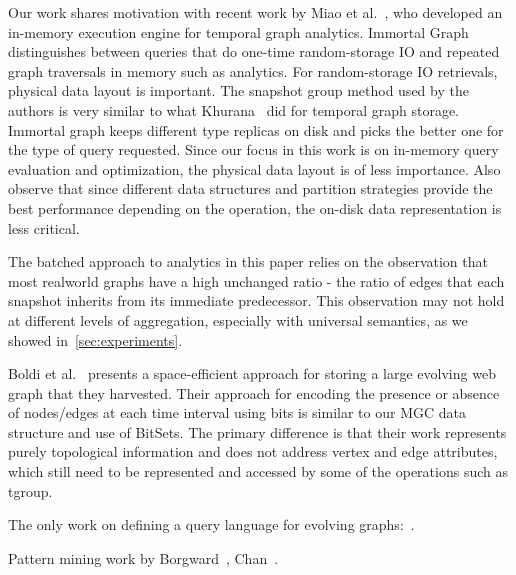 Our work shares motivation with recent work by Miao et
al.~\cite{DBLP:journals/tos/MiaoHLWYZPCC15}, who developed an
in-memory execution engine for temporal graph analytics.  Immortal
Graph distinguishes between queries that do one-time random-storage IO
and repeated graph traversals in memory such as analytics.  For
random-storage IO retrievals, physical data layout is important.  The
snapshot group method used by the authors is very similar to what
Khurana~\cite{Khurana2013} did for temporal graph storage.  Immortal
graph keeps different type replicas on disk and picks the better one
for the type of query requested.  Since our focus in this work is on
in-memory query evaluation and optimization, the physical data layout
is of less importance.  Also observe that since different data
structures and partition strategies provide the best performance
depending on the operation, the on-disk data representation is less
critical. 

The batched approach to analytics in this paper relies on the
observation that most realworld graphs have a high unchanged ratio -
the ratio of edges that each snapshot inherits from its immediate
predecessor.  This observation may not hold at different levels of
aggregation, especially with universal semantics, as we showed
in~\ref{sec:experiments}.

Boldi et al.~\cite{Boldi2008} presents a space-efficient approach for
storing a large evolving web graph that they harvested.  Their
approach for encoding the presence or absence of nodes/edges at each
time interval using bits is similar to our MGC data structure and use
of BitSets.  The primary difference is that their work represents
purely topological information and does not address vertex and edge
attributes, which still need to be represented and accessed by some of
the operations such as tgroup.

The only work on defining a query language for evolving graphs:~\cite{Kan2009}.

Pattern mining work by Borgward~\cite{Borgwardt2006}, Chan~\cite{Chan2008}.

